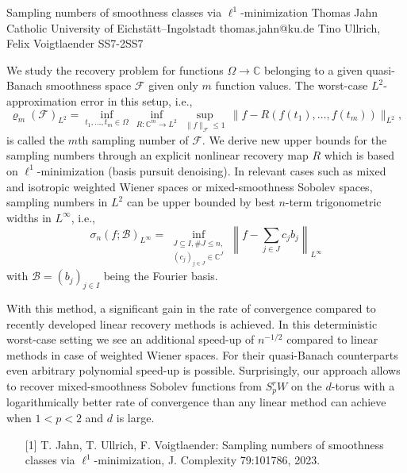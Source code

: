 \begin{talk}
  {Sampling numbers of smoothness classes via $\ell^1$-minimization}%
  {Thomas Jahn}%
  {Catholic University of Eichstätt--Ingolstadt}%
  {thomas.jahn@ku.de}%
  {Tino Ullrich, Felix Voigtlaender}%
{}{}{SS7-2}{SS7}


				
We study the recovery problem for functions $\Omega\to\mathbb{C}$ belonging to a given quasi-Banach smoothness space $\mathcal{F}$ given only $m$ function values.
The worst-case $L^2$-approximation error in this setup, i.e.,
$$
  \varrho_m (\mathcal{F})_{L^2}
  = \inf_{t_1,\ldots,t_m \in \Omega}\,
       \inf_{R : \mathbb{C}^m \to L^2}\,
         \sup_{\|f\|_{\mathcal{F}} \leq 1}\,
           \|f - R(f(t_1),\ldots,f(t_m))\|_{L^2},
$$
is called the $m$th sampling number of $\mathcal{F}$.
We derive new upper bounds for the sampling numbers through an explicit nonlinear recovery map $R$ which is based on $\ell^1$-minimization (basis pursuit denoising).
In relevant cases such as mixed and isotropic weighted Wiener spaces or mixed-smoothness Sobolev spaces, sampling numbers in $L^2$ can be upper bounded by best $n$-term trigonometric widths in $L^\infty$, i.e.,
$$
  \sigma_n (f; \mathcal{B})_{L^\infty}
  = \inf_{\substack{J \subseteq I, \#J \leq n,\\ (c_j)_{j \in J} \in \mathbb{C}^J}}\left\|f - \sum_{j \in J}c_jb_j\right\|_{L^\infty}
$$
with $\mathcal{B}=(b_j)_{j\in I}$ being the Fourier basis.

With this method, a significant gain in the rate of convergence compared to recently developed linear recovery methods is achieved. 
In this deterministic worst-case setting we see an additional speed-up of $n^{-1/2}$ compared to linear methods in case of weighted Wiener spaces.
For their quasi-Banach counterparts even arbitrary polynomial speed-up is possible.
Surprisingly, our approach allows to recover mixed-smoothness Sobolev functions from $S_p^rW$ on the $d$-torus with a logarithmically better rate of convergence than any linear method can achieve when $1<p<2$ and $d$ is large.\

\medskip

\begin{itemize}
\item[{[1]}]{T. Jahn, T. Ullrich, F. Voigtlaender: Sampling numbers of smoothness classes via $\ell^1$-minimization, J. Complexity 79:101786, 2023.}
\end{itemize}
\end{talk}

